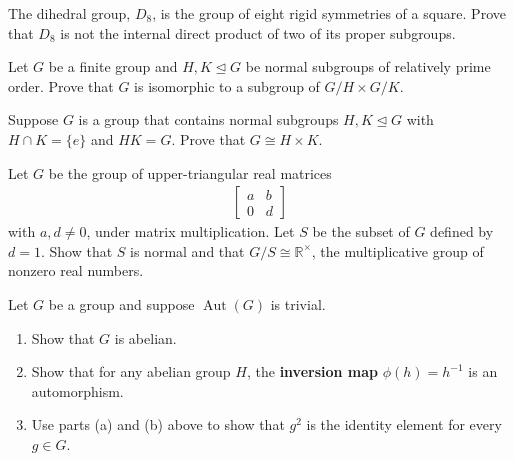 \documentclass[11pt,twoside,openany]{memoir}
\begin{document}
        \begin{exercise}
        The dihedral group, $D_8$, is the group of eight rigid symmetries of a square. Prove that $D_8$ is not the internal direct product of two of its proper subgroups.
        \end{exercise}
        
        \begin{exercise}
        Let $G$ be a finite group and $H,K\mathrel{\unlhd}G$ be normal subgroups of relatively prime order. Prove that $G$ is isomorphic to a subgroup of $G/H\times G/K$.
        \end{exercise}
        
        \begin{exercise}
        Suppose $G$ is a group that contains normal subgroups $H,K\unlhd G$ with $H\cap K=\{e\}$ and $HK=G$. Prove that $G\cong H\times K$.
        \end{exercise}
        
        \begin{exercise}
        Let $G$ be the group of upper-triangular real matrices 
        \begin{equation*}
        \begin{split}
        \begin{bmatrix} a & b \\ 0 & d\end{bmatrix}
        \end{split}
        \end{equation*}
        with $a,d\neq 0$, under matrix multiplication. Let $S$ be the subset of $G$ defined by $d=1$. Show that $S$ is normal and that $G/S\cong \mathbb{R}^{\times}$, the multiplicative group of nonzero real numbers.
        \end{exercise}
        
        \begin{exercise}
        Let $G$ be a group and suppose $\operatorname{Aut}(G)$ is trivial.
        \begin{enumerate}[label=(\alph*)]
            \item Show that $G$ is abelian.
            \item Show that for any abelian group $H$, the \textbf{inversion map} $\phi(h)=h^{-1}$ is an automorphism.
            \item Use parts (a) and (b) above to show that $g^2$ is the identity element for every $g\in G$.
        \end{enumerate}
        \end{exercise}
        
\end{document}

